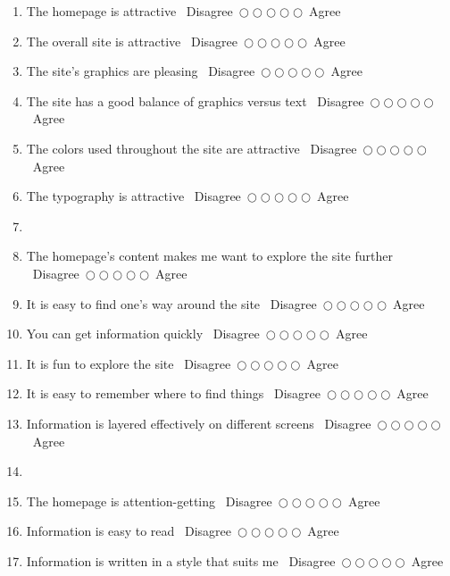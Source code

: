 \documentclass[a4paper]{article}
\newcommand{\ratingMark}{
  \hfill{}\mbox{
    {\footnotesize Disagree $\bigcirc \bigcirc \bigcirc \bigcirc \bigcirc$ Agree}
    }
}
\begin{document}
\begin{enumerate}
    \item The homepage is attractive   \ratingMark                     

  \item The overall site is attractive  \ratingMark

  \item The site's graphics are pleasing  \ratingMark                        

  \item The site has a good balance of graphics versus text  \ratingMark                        

  \item The colors used throughout the site are attractive  \ratingMark                        

  \item The typography is attractive  \ratingMark                        

  \item[]                          

  \item The homepage's content makes me want to explore the site further  \ratingMark                        

  \item It is easy to find one's way around the site  \ratingMark                        

  \item You can get information quickly  \ratingMark                        

  \item It is fun to explore the site  \ratingMark                        

  \item It is easy to remember where to find things  \ratingMark                        

  \item Information is layered effectively on different screens  \ratingMark                        

  \item[]                          

  \item The homepage is attention-getting  \ratingMark                        

  \item Information is easy to read  \ratingMark                        

  \item Information is written in a style that suits me  \ratingMark                        


\end{enumerate}
\end{document}
